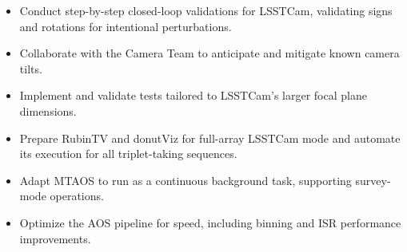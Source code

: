 \begin{itemize}
\item
  Conduct step-by-step closed-loop validations for LSSTCam, validating signs and rotations for intentional perturbations.
\item
  Collaborate with the Camera Team to anticipate and mitigate known camera tilts.
\item
  Implement and validate tests tailored to LSSTCam's larger focal plane dimensions.
\item
  Prepare RubinTV and donutViz for full-array LSSTCam mode and automate its execution for all triplet-taking sequences.
\item
  Adapt MTAOS to run as a continuous background task, supporting survey-mode operations.
\item
  Optimize the AOS pipeline for speed, including binning and ISR performance improvements.
\end{itemize}

